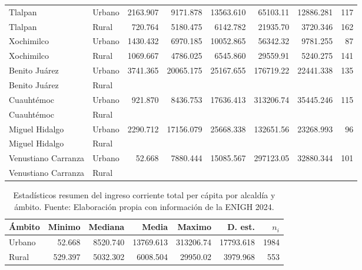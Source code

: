 \documentclass[11pt]{article}
\begin{document}
\begin{table}[H]
\begin{tabular}{ll *{6}{r}}
Tlalpan & Urbano & 2163.907 & 9171.878 & 13563.610 & 65103.11 & 12886.281 & 117\\
Tlalpan & Rural & 720.764 & 5180.475 & 6142.782 & 21935.70 & 3720.346 & 162\\
Xochimilco & Urbano & 1430.432 & 6970.185 & 10052.865 & 56342.32 & 9781.255 & 87\\
Xochimilco & Rural & 1069.667 & 4786.025 & 6545.860 & 29559.91 & 5240.275 & 141\\
Benito Juárez & Urbano & 3741.365 & 20065.175 & 25167.655 & 176719.22 & 22441.338 & 135\\
Benito Juárez & Rural &  &  &  &  &  & \\
Cuauhtémoc & Urbano & 921.870 & 8436.753 & 17636.413 & 313206.74 & 35445.246 & 115\\
Cuauhtémoc & Rural &  &  &  &  &  & \\
Miguel Hidalgo & Urbano & 2290.712 & 17156.079 & 25668.338 & 132651.56 & 23268.993 & 96\\
Miguel Hidalgo & Rural &  &  &  &  &  & \\
Venustiano Carranza & Urbano & 52.668 & 7880.444 & 15085.567 & 297123.05 & 32880.344 & 101\\
Venustiano Carranza & Rural &  &  &  &  &  & \\
\hline
\end{tabular}
\end{table}

\begin{table}[H]
\caption{Estadísticos resumen del ingreso corriente total per cápita por alcaldía y ámbito. Fuente: Elaboración propia con información de la ENIGH 2024.}
\label{tab:descripcion_ambito}
\centering
\begin{tabular}{lrrrrrr}
\hline
Ámbito & Minimo & Mediana & Media & Maximo & D. est. & $n_{i}$ \\
\hline
Urbano & 52.668 & 8520.740 & 13769.613 & 313206.74 & 17793.618 & 1984\\
\hline
Rural & 529.397 & 5032.302 & 6008.504 & 29950.02 & 3979.968 & 553\\
\hline
\end{tabular}
\end{table}

\end{document}
